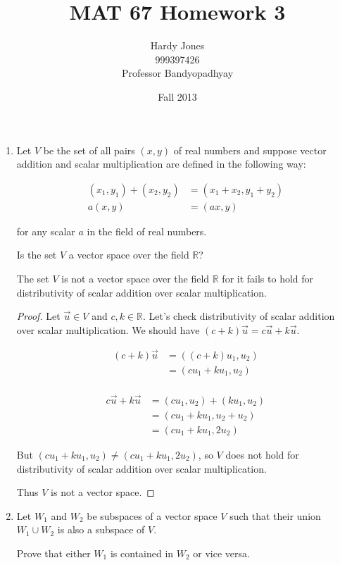 \documentclass[12pt,letterpaper]{article}
\title{MAT 67 Homework 3\vspace{-2ex}}
\author{Hardy Jones\\
        999397426\\
        Professor Bandyopadhyay\vspace{-2ex}}
\date{Fall 2013}
\begin{document}
  \maketitle

  \begin{enumerate}
    \item
      Let $V$ be the set of all pairs $(x,y)$ of real numbers and suppose vector addition and scalar multiplication are defined in the following way:

      \begin{align*}
        (x_1,y_1) + (x_2,y_2) &= (x_1 + x_2, y_1 + y_2) \\
        a(x,y) &= (ax,y)
      \end{align*}

      for any scalar $a$ in the field of real numbers.

      Is the set $V$ a vector space over the field $\mathbb{R}$?

      The set $V$ is not a vector space over the field $\mathbb{R}$ for it fails to hold for distributivity of scalar addition over scalar multiplication.

      \begin{proof}

        Let $\vec{u} \in V$ and $ c, k \in \mathbb{R}$.  Let's check distributivity of scalar addition over scalar multiplication.  We should have $(c + k)\vec{u} = c\vec{u} + k\vec{u}$.

        \begin{align*}
          (c + k)\vec{u} &= ((c + k)u_1, u_2) \\
          &= (cu_1 + ku_1, u_2) \\
        \end{align*}

        \begin{align*}
          c\vec{u} + k\vec{u} &= (cu_1, u_2) + (ku_1, u_2) \\
          &= (cu_1 + ku_1, u_2 + u_2) \\
          &= (cu_1 + ku_1, 2u_2)
        \end{align*}

        But $(cu_1 + ku_1, u_2) \neq (cu_1 + ku_1, 2u_2)$,
        so $V$ does not hold for distributivity of scalar addition over scalar multiplication.

        Thus $V$ is not a vector space.
      \end{proof}

    \item
      Let $W_1$ and $W_2$ be subspaces of a vector space $V$ such that their union $W_1 \cup W_2$ is also a subspace of $V$.

      Prove that either $W_1$ is contained in $W_2$ or vice versa.
  \end{enumerate}
\end{document}
